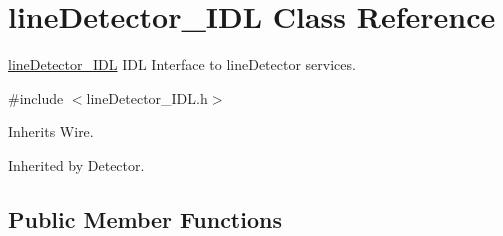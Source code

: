 \section{line\+Detector\+\_\+\+I\+DL Class Reference}
\label{classlineDetector__IDL}


\hyperlink{classlineDetector__IDL}{line\+Detector\+\_\+\+I\+DL} I\+DL Interface to line\+Detector services.  




{\ttfamily \#include $<$line\+Detector\+\_\+\+I\+D\+L.\+h$>$}



Inherits Wire.



Inherited by Detector.

\subsection*{Public Member Functions}
